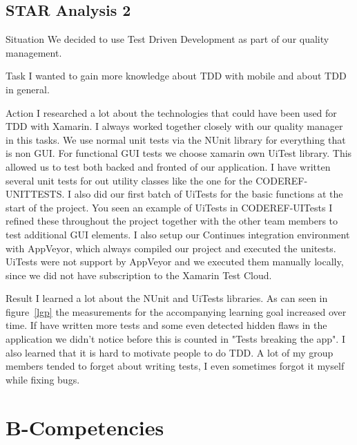 \documentclass[12pt]{article}
\begin{document}
\subsection{STAR Analysis 2}
\begin{STAR}
    \item[Situation] We decided to use Test Driven Development as part of our quality management. 
    \item[Task] I wanted to gain more knowledge about TDD with mobile and about TDD in general. 
    \item[Action] I researched a lot about the technologies that could have been used for TDD with Xamarin. I always worked together closely with our quality manager in this tasks. We use normal unit tests via the NUnit library for everything that is non GUI. For functional GUI tests we choose xamarin own UiTest library. This allowed us to test both backed and fronted of our application. I have written several unit tests for out utility classes like the one for the CODEREF-UNITTESTS. I also did our first batch of UiTests for the basic functions at the start of the project. You seen an example of UiTests in CODEREF-UITests I refined these throughout the project together with the other team members to test additional GUI elements. I also setup our Continues integration environment with AppVeyor, which always compiled our project and executed the unitests. UiTests were not support by AppVeyor and we executed them manually locally, since we did not have subscription to the Xamarin Test Cloud.
    \item[Result] I learned a lot about the NUnit and UiTests libraries. 
    As can seen in figure~\ref{lgp} the measurements for the accompanying learning goal increased over time. If have written more tests and some even detected hidden flaws in the application we didn't notice before this is counted in "Tests breaking the app". I also learned that it is hard to motivate people to do TDD. A lot of my group members tended to forget about writing tests, I even sometimes forgot it myself while fixing bugs.
\end{STAR}

\section{B-Competencies}
\end{document}
